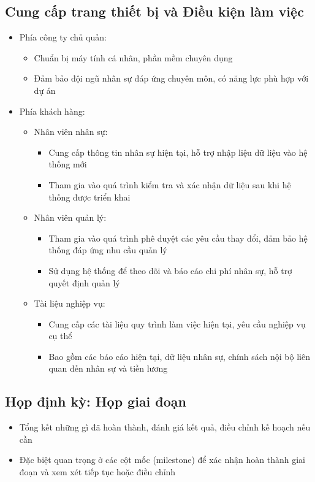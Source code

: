 \subsection{Cung cấp trang thiết bị và Điều kiện làm việc}
\begin{itemize}
    \item Phía công ty chủ quản:
    \begin{itemize}
        \item Chuẩn bị máy tính cá nhân, phần mềm chuyên dụng
        \item Đảm bảo đội ngũ nhân sự đáp ứng chuyên môn, có năng lực phù hợp với dự án
    \end{itemize}
    \item Phía khách hàng:
    \begin{itemize}
        \item Nhân viên nhân sự:
        \begin{itemize}
            \item Cung cấp thông tin nhân sự hiện tại, hỗ trợ nhập liệu dữ liệu vào hệ thống mới
            \item Tham gia vào quá trình kiểm tra và xác nhận dữ liệu sau khi hệ thống được triển khai
        \end{itemize}
        \item Nhân viên quản lý:
        \begin{itemize}
            \item Tham gia vào quá trình phê duyệt các yêu cầu thay đổi, đảm bảo hệ thống đáp ứng nhu cầu quản lý
            \item Sử dụng hệ thống để theo dõi và báo cáo chi phí nhân sự, hỗ trợ quyết định quản lý
        \end{itemize}
        \item Tài liệu nghiệp vụ:
        \begin{itemize}
            \item Cung cấp các tài liệu quy trình làm việc hiện tại, yêu cầu nghiệp vụ cụ thể
            \item Bao gồm các báo cáo hiện tại, dữ liệu nhân sự, chính sách nội bộ liên quan đến nhân sự và tiền lương
        \end{itemize}
    \end{itemize}
\end{itemize}

\subsection{Họp định kỳ: Họp giai đoạn}
\begin{itemize}
    \item Tổng kết những gì đã hoàn thành, đánh giá kết quả, điều chỉnh kế hoạch nếu cần
    \item Đặc biệt quan trọng ở các cột mốc (milestone) để xác nhận hoàn thành giai đoạn và xem xét tiếp tục hoặc điều chỉnh
\end{itemize}
